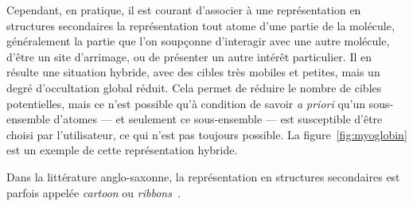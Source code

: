 	Cependant, en pratique, il est courant d'associer à une représentation en structures secondaires la représentation \og tout atome \fg{} d'une partie de la molécule, généralement la partie que l'on soupçonne d'interagir avec une autre molécule, d'être un site d'arrimage, ou de présenter un autre intérêt particulier. Il en résulte une situation hybride, avec des cibles très mobiles et petites, mais un degré d'occultation global réduit. Cela permet de réduire le nombre de cibles potentielles, mais ce n'est possible qu'à condition de savoir \emph{a priori} qu'un sous-ensemble d'atomes --- et seulement ce sous-ensemble --- est susceptible d'être choisi par l'utilisateur, ce qui n'est pas toujours possible. La figure~\ref{fig:myoglobin} est un exemple de cette représentation hybride.


	
	Dans la littérature anglo-saxonne, la représentation en structures secondaires est parfois appelée \emph{cartoon} ou \emph{ribbons}~\cite{carson1986algorithm, richardson2000early}.
	
	
